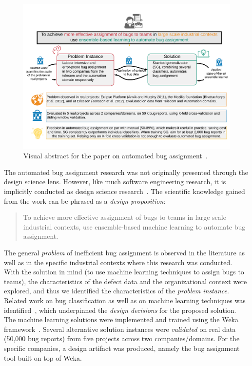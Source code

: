\documentclass[graybox]{svmult}
\begin{document}
\begin{figure}[t]
\begin{center}
\includegraphics[width=\columnwidth, trim={5mm 20mm 5mm 20mm },clip]{Figures/VATemplateJonsson.pdf}
\caption{Visual abstract for the paper on automated bug assignment~\cite{JonssonBug15}.}
\label{fig:BugAssignment}
\end{center}
\end{figure}

The automated bug assignment research was not originally presented through the design science lens. However, like much software engineering research, it is implicitly conducted as design science research~\cite{Engstrom19arxiv}. 
The scientific knowledge gained from the work can be phrased as a \emph{design proposition}:
\begin{quote}{To achieve more effective assignment of bugs to teams in large scale industrial contexts, use ensemble-based machine learning to automate bug assignment.~\cite{StoreyESEM17}}\end{quote}

The general \emph{problem} of inefficient bug assignment is observed in the literature as well as in the specific industrial contexts where this research was conducted. With the solution in mind (to use machine learning techniques to assign bugs to teams), the characteristics of the defect data and the organizational context were explored, and thus we identified the characteristics of the \emph{problem instance}. Related work on bug classification as well as on machine learning techniques was identified~\cite{Borg2013EMSE}, which underpinned the \emph{design decisions} for the proposed solution. The machine learning solutions were implemented and trained using the Weka framework~\cite{hall_weka_2009}. Several alternative solution instances were \emph{validated} on real data (50,000 bug reports) from five projects across two companies/domains. For the specific companies, a design artifact was produced, namely the bug assignment tool built on top of Weka.
\end{document}
